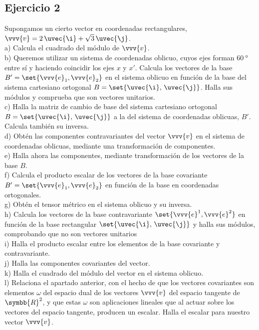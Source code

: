 \newpage
\subsection{Ejercicio 2}
\noindent Supongamos un cierto vector en coordenadas rectangulares,
$\vvv{v} = 2\,\uvec{\i} + \sqrt{3}\,\uvec{\j}$.\\
a) Calcula el cuadrado del módulo de $\vvv{v}$.\\
b) Queremos utilizar un sistema de coordenadas oblicuo, cuyos ejes forman
$\qty{60}{\degree}$ entre sí y haciendo coincidir los ejes $x$ y $x'$.
Calcula los vectores de la base $B'=\set{\vvv{e}_1, \vvv{e}_2}$ en el sistema oblicuo
en función de la base del sistema cartesiano ortogonal $B=\set{\uvec{\i},\,\uvec{\j}}$.
Halla sus módulos y comprueba que son vectores unitarios.\\
c) Halla la matriz de cambio de base del sistema cartesiano ortogonal
$B=\set{\uvec{\i},\,\uvec{\j}}$ a la del sistema de coordenadas oblicuas, $B'$.
Calcula también su inversa.\\
d) Obtén las componentes contravariantes del vector $\vvv{v}$ en el sistema de
coordenadas oblicuas, mediante una transformación de componentes.\\
e) Halla ahora las componentes, mediante transformación de los vectores de la base $B$.\\
f) Calcula el producto escalar de los vectores de la base covariante
$B'=\set{\vvv{e}_1, \vvv{e}_2}$ en función de la base en coordenadas ortogonales.\\
g) Obtén el tensor métrico en el sistema oblicuo y su inversa.\\
h) Calcula los vectores de la base contravariante $\set{\vvv{e}^1,\vvv{e}^2}$ en función
de la base rectangular $\set{\uvec{\i},\,\uvec{\j}}$ y halla sus módulos, comprobando
que no son vectores unitarios\\
i) Halla el producto escalar entre los elementos de la base covariante y contravariante.\\
j) Halla las componentes covariantes del vector.\\
k) Halla el cuadrado del módulo del vector en el sistema oblicuo.\\
l) Relaciona el apartado anterior, con el hecho de que los vectores covariantes son
elementos $\omega$ del espacio dual de los vectores $\vvv{v}$ del espacio tangente de $\symbb{R}^2$, y que estas $\omega$ son aplicaciones lineales que al actuar sobre los
vectores del espacio tangente, producen un escalar. Halla el escalar para nuestro vector
$\vvv{v}$.\\

